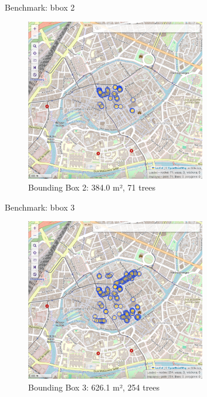 \documentclass[10pt]{beamer}
\begin{document}
\begin{frame}{Benchmark: bbox 2}
  \begin{figure}[H]
    \centering
    \includegraphics[width=0.7\textwidth]{images/bbox2.png}
    \caption{Bounding Box 2: 384.0 m², 71 trees}
\end{figure}
\end{frame}

\begin{frame}{Benchmark: bbox 3}
  \begin{figure}[H]
    \centering
    \includegraphics[width=0.7\textwidth]{images/bbox3.png}
    \caption{Bounding Box 3: 626.1 m², 254 trees}
\end{figure}
\end{frame}
\end{document}
